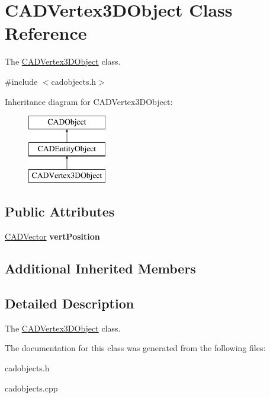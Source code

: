 \hypertarget{class_c_a_d_vertex3_d_object}{}\section{C\+A\+D\+Vertex3\+D\+Object Class Reference}
\label{class_c_a_d_vertex3_d_object}


The \hyperlink{class_c_a_d_vertex3_d_object}{C\+A\+D\+Vertex3\+D\+Object} class.  




{\ttfamily \#include $<$cadobjects.\+h$>$}

Inheritance diagram for C\+A\+D\+Vertex3\+D\+Object\+:\begin{figure}[H]
\begin{center}
\leavevmode
\includegraphics[height=3.000000cm]{class_c_a_d_vertex3_d_object}
\end{center}
\end{figure}
\subsection*{Public Attributes}
\begin{DoxyCompactItemize}
\item 
\hyperlink{class_c_a_d_vector}{C\+A\+D\+Vector} {\bfseries vert\+Position}\hypertarget{class_c_a_d_vertex3_d_object_ab9945028d0df22a7e7976ad416960c81}{}\label{class_c_a_d_vertex3_d_object_ab9945028d0df22a7e7976ad416960c81}

\end{DoxyCompactItemize}
\subsection*{Additional Inherited Members}


\subsection{Detailed Description}
The \hyperlink{class_c_a_d_vertex3_d_object}{C\+A\+D\+Vertex3\+D\+Object} class. 

The documentation for this class was generated from the following files\+:\begin{DoxyCompactItemize}
\item 
cadobjects.\+h\item 
cadobjects.\+cpp\end{DoxyCompactItemize}
